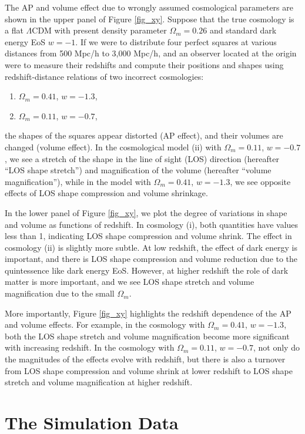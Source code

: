 \documentclass[iop]{emulateapj}
\begin{document}
The AP and volume effect due to wrongly assumed cosmological parameters are shown in the upper panel of Figure \ref{fig_xy}.
Suppose that the true cosmology is a flat $\Lambda$CDM with present density parameter $\Omega_m=0.26$
and standard dark energy EoS $w=-1$.
If we were to distribute four perfect squares at various distances from 500 Mpc/h to 3,000 Mpc/h,
and an observer located at the origin were to measure their redshifts and compute their positions and shapes 
using redshift-distance relations of two incorrect cosmologies:
\begin{enumerate}
 \item $\Omega_m=0.41$, $w=-1.3$,
 \item $\Omega_m=0.11$, $w=-0.7$,
\end{enumerate}
the shapes of the squares appear distorted (AP effect),
and their volumes are changed (volume effect).
In the cosmological model (ii) with $\Omega_m=0.11$, $w=-0.7$, we see a stretch of the shape in the line of sight (LOS) direction (hereafter ``LOS shape stretch'')
and magnification of the volume (hereafter ``volume magnification''), 
while in the model with $\Omega_m=0.41$, $w=-1.3$, we see opposite effects of LOS shape compression and volume shrinkage.

In the lower panel of Figure \ref{fig_xy}, we plot the degree of variations in shape and volume as functions of redshift. 
In cosmology (i), both quantities have values less than 1, 
indicating LOS shape compression and volume shrink.
The effect in cosmology (ii) is slightly more subtle. At low redshift, the effect of dark energy is important, 
and there is LOS shape compression and volume reduction due to the quintessence like dark energy EoS.
However, at higher redshift the role of dark matter is more important, and we see LOS shape stretch and volume magnification due to the small $\Omega_m$.

More importantly, Figure \ref{fig_xy} highlights the redshift dependence of the AP and volume effects. 
For example, in the cosmology with $\Omega_m=0.41$, $w=-1.3$, 
both the LOS shape stretch and volume magnification become more significant with increasing redshift.
In the cosmology with $\Omega_m=0.11$, $w=-0.7$,
not only do the magnitudes of the effects evolve with redshift,
but there is also a turnover from LOS shape compression and volume shrink at lower redshift to LOS shape stretch and volume magnification at higher redshift.



\section{The Simulation Data}\label{sec:data}
\end{document}
